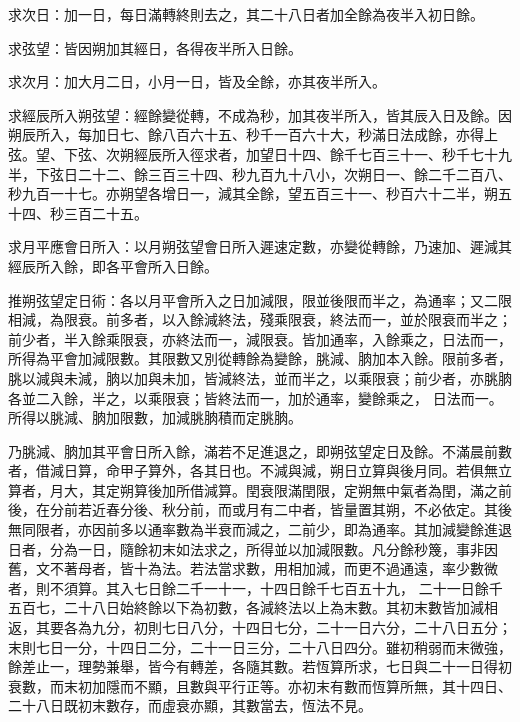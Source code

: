 \begin{pinyinscope}
 求次日：加一日，每日滿轉終則去之，其二十八日者加全餘為夜半入初日餘。



 求弦望：皆因朔加其經日，各得夜半所入日餘。



 求次月：加大月二日，小月一日，皆及全餘，亦其夜半所入。



 求經辰所入朔弦望：經餘變從轉，不成為秒，加其夜半所入，皆其辰入日及餘。因朔辰所入，每加日七、餘八百六十五、秒千一百六十大，秒滿日法成餘，亦得上弦。望、下弦、次朔經辰所入徑求者，加望日十四、餘千七百三十一、秒千七十九半，下弦日二十二、餘三百三十四、秒九百九十八小，次朔日一、餘二千二百八、秒九百一十七。亦朔望各增日一，減其全餘，望五百三十一、秒百六十二半，朔五十四、秒三百二十五。



 求月平應會日所入：以月朔弦望會日所入遲速定數，亦變從轉餘，乃速加、遲減其經辰所入餘，即各平會所入日餘。



 推朔弦望定日術：各以月平會所入之日加減限，限並後限而半之，為通率；又二限相減，為限衰。前多者，以入餘減終法，殘乘限衰，終法而一，並於限衰而半之；前少者，半入餘乘限衰，亦終法而一，減限衰。皆加通率，入餘乘之，日法而一，所得為平會加減限數。其限數又別從轉餘為變餘，朓減、朒加本入餘。限前多者，朓以減與未減，朒以加與未加，皆減終法，並而半之，以乘限衰；前少者，亦朓朒各並二入餘，半之，以乘限衰；皆終法而一，加於通率，變餘乘之，
 日法而一。所得以朓減、朒加限數，加減朓朒積而定朓朒。



 乃朓減、朒加其平會日所入餘，滿若不足進退之，即朔弦望定日及餘。不滿晨前數者，借減日算，命甲子算外，各其日也。不減與減，朔日立算與後月同。若俱無立算者，月大，其定朔算後加所借減算。閏衰限滿閏限，定朔無中氣者為閏，滿之前後，在分前若近春分後、秋分前，而或月有二中者，皆量置其朔，不必依定。其後無同限者，亦因前多以通率數為半衰而減之，二前少，即為通率。其加減變餘進退日者，分為一日，隨餘初末如法求之，所得並以加減限數。凡分餘秒篾，事非因舊，文不著母者，皆十為法。若法當求數，用相加減，而更不過通遠，率少數微者，則不須算。其入七日餘二千一十一，十四日餘千七百五十九，
 二十一日餘千五百七，二十八日始終餘以下為初數，各減終法以上為末數。其初末數皆加減相返，其要各為九分，初則七日八分，十四日七分，二十一日六分，二十八日五分；末則七日一分，十四日二分，二十一日三分，二十八日四分。雖初稍弱而末微強，餘差止一，理勢兼舉，皆今有轉差，各隨其數。若恆算所求，七日與二十一日得初衰數，而末初加隱而不顯，且數與平行正等。亦初末有數而恆算所無，其十四日、二十八日既初末數存，而虛衰亦顯，其數當去，恆法不見。




\end{pinyinscope}
